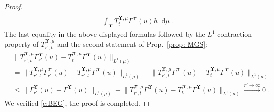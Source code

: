 \documentclass[11pt,letterpaper]{amsart}
\newcommand{\diff}{\mathop{}\!\mathrm{d}}
\newcommand{\fstop}{\,\,\mathrm{.}}
\newcommand{\cdc}{\Gamma}
\newcommand{\QP}{{\mu}}
\newcommand{\dUpsilon}{{\mathbf \Upsilon}}
\newcommand{\U}{\dUpsilon}
\renewcommand{\1}{\mathbf 1}
\numberwithin{equation}{section}
\theoremstyle{plain}
\theoremstyle{definition}
\theoremstyle{remark}
\begin{document}
\begin{proof}
\begin{align*}
\\
&= \int_{\U}  T^{\U, \QP}_t\cdc^{\U}(u) h \diff \QP \fstop
\end{align*}
The last equality in the above displayed formulas followed by the $L^1$-contraction property of $T_{r', t}^{\U, \QP}$ and the second statement of Prop.\ \ref{prop: MGS}:
\begin{align*}
&\bigl\|T_{r', t}^{\U, \QP} \cdc^{\U}_{r'}(u) - T^{\U, \QP}_t \cdc^{\U}(u) \bigr\|_{L^1(\QP)} 
\\
&= \bigl\|T_{r', t}^{\U, \QP} \cdc^{\U}_{r'}(u) - T^{\U, \QP}_{r', t} \cdc^{\U}(u) \bigr\|_{L^1(\QP)} + \bigl\|T^{\U, \QP}_{r', t} \cdc^{\U}(u) - T^{\U, \QP}_t \cdc^{\U}(u)\bigr\|_{L^1(\QP)} 
\\
& \le \bigl\| \cdc^{\U}_{r'}(u) -  \cdc^{\U}(u)\bigr\|_{L^1(\QP)} + \bigl\|T^{\U, \QP}_{r', t} \cdc^{\U}(u) - T^{\U, \QP}_t \Gamma^{\U}(u)\bigr\|_{L^1(\QP)} 
\xrightarrow{r' \to \infty} 0 \fstop
\end{align*}
We verified \eqref{e:BEG}, the proof is completed.
\end{proof}
\end{document}
